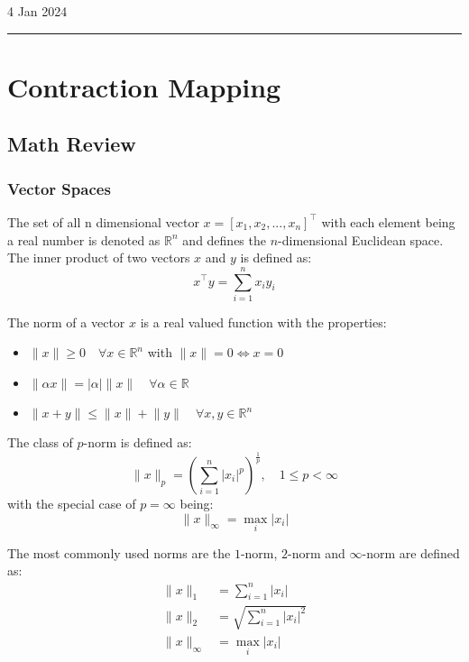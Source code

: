 \hfill\small{4 Jan 2024}
\vspace{0.5em}
\hrule
\vspace{-0.5em}
\section{Contraction Mapping}

\subsection{Math Review}

\subsubsection{Vector Spaces}

The set of all n dimensional vector \(x = [x_1, x_2, ..., x_n]^{\top} \) with each element being 
a real number is denoted as \(\mathbb{R}^n\) and defines the \(n\)-dimensional Euclidean space.
The inner product of two vectors \(x\) and \(y\) is defined as:
\[
    x^{\top} y = \sum\limits_{i=1}^{n} x_i y_i
\]

The norm of a vector \(x\) is a real valued function with the properties:

\begin{itemize}
    \item \(\lVert x \rVert \geq 0 \quad \forall x \in \mathbb{R}^n\) with \(\lVert x \rVert = 0 \iff x = 0\)
    \item \(\lVert \alpha x \rVert = \lvert \alpha \rvert \lVert x \rVert \quad \forall \alpha \in \mathbb{R}\)
    \item \(\lVert x + y \rVert \leq \lVert x \rVert + \lVert y \rVert \quad \forall x, y \in \mathbb{R}^n\)
\end{itemize}

The class of \(p\)-norm is defined as:
\[
    \lVert x \rVert_p = \left( \sum\limits_{i=1}^{n} \lvert x_i \rvert^p \right)^{\frac{1}{p}} 
    , \quad 1 \leq p < \infty 
\]
with the special case of \(p = \infty\) being:
\[
    \lVert x \rVert_{\infty} = \max\limits_{i} \lvert x_i \rvert
\]

The most commonly used norms are the \(1\)-norm, \(2\)-norm and \(\infty\)-norm are defined as:
\[
    \begin{aligned}
        \lVert x \rVert_1 &= \sum\limits_{i=1}^{n} \lvert x_i \rvert \\
        \lVert x \rVert_2 &= \sqrt{\sum\limits_{i=1}^{n} \lvert x_i \rvert^2} \\
        \lVert x \rVert_{\infty} &= \max\limits_{i} \lvert x_i \rvert
    \end{aligned}
\]

